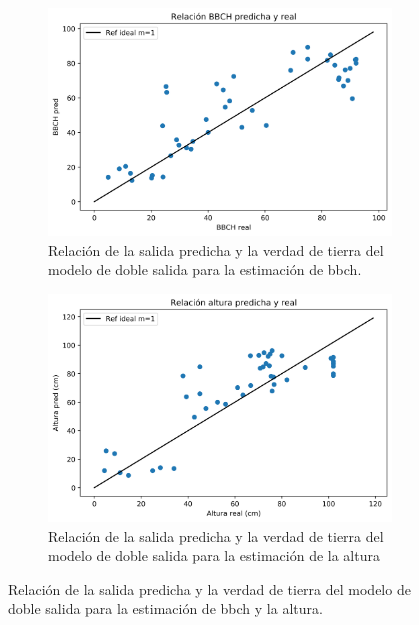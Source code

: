 \begin{figure}[H]
\centering
\begin{subfigure}{.8\textwidth}
  \centering
  \includegraphics[width=0.95\linewidth]{archivos/tfg/Mean/TEST_PARC_RECTA_bh}
  \caption{Relación de la salida predicha y la verdad de tierra del modelo de doble salida para la estimación de \gls{bbch}. \label{fig:rel_bh_b}}
\end{subfigure}
\begin{subfigure}{.8\textwidth}
  \centering
  \includegraphics[width=0.95\linewidth]{archivos/tfg/Mean/TEST_PARC_RECTA_bh_H}
  \caption{Relación de la salida predicha y la verdad de tierra del modelo de doble salida para la estimación de la altura\label{fig:rel_bh_h}}
\end{subfigure}
\caption{Relación de la salida predicha y la verdad de tierra del modelo de doble salida para la estimación de \gls{bbch} y la altura. \label{fig:rel_bh}}
\end{figure}

